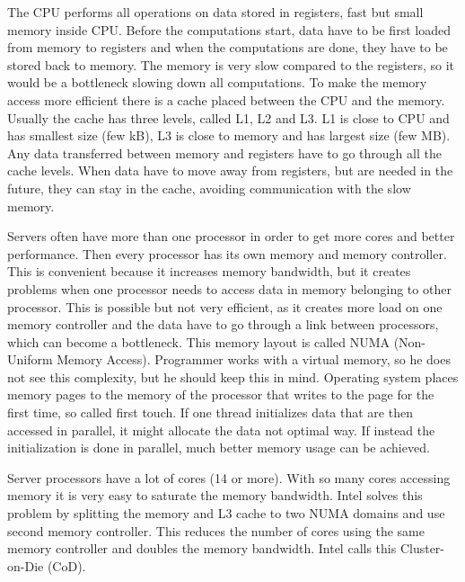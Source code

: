 The CPU performs all operations on data stored in registers, fast but small memory inside CPU. Before the computations start, data have to be first loaded from memory to registers and when the computations are done, they have to be stored back to memory. The memory is very slow compared to the registers, so it would be a bottleneck slowing down all computations. To make the memory access more efficient there is a cache placed between the CPU and the memory. Usually the cache has three levels, called L1, L2 and L3. L1 is close to CPU and has smallest size (few kB), L3 is close to memory and has largest size (few MB). Any data transferred between memory and registers have to go through all the cache levels. When data have to move away from registers, but are needed in the future, they can stay in the cache, avoiding communication with the slow memory.

Servers often have more than one processor in order to get more cores and better performance. Then every processor has its own memory and memory controller. This is convenient because it increases memory bandwidth, but it creates problems when one processor needs to access data in memory belonging to other processor. This is possible but not very efficient, as it creates more load on one memory controller and the data have to go through a link between processors, which can become a bottleneck. This memory layout is called NUMA (Non-Uniform Memory Access). Programmer works with a virtual memory, so he does not see this complexity, but he should keep this in mind. Operating system places memory pages to the memory of the processor that writes to the page for the first time, so called first touch. If one thread initializes data that are then accessed in parallel, it might allocate the data not optimal way. If instead the initialization is done in parallel, much better memory usage can be achieved.

Server processors have a lot of cores (14 or more). With so many cores accessing memory it is very easy to saturate the memory bandwidth. Intel solves this problem by splitting the memory and L3 cache to two NUMA domains and use second memory controller. This reduces the number of cores using the same memory controller and doubles the memory bandwidth. Intel calls this Cluster-on-Die (CoD).

